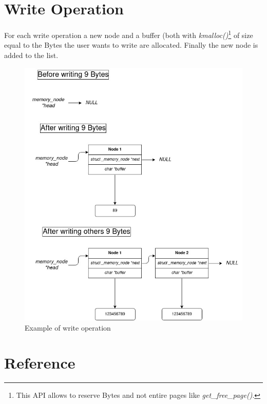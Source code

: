 \documentclass[12pt]{report}
\begin{document}
\chapter{Write Operation}
\label{chap:write operation} 
For each write operation a new node and a buffer (both with \emph{kmalloc()}\footnote{This API allows to reserve Bytes and not entire pages like \emph{get\_free\_page()}.} of size equal to the Bytes the user wants to write are allocated. Finally the new node is added to the list.

\begin{figure}[h]
	\centering
	\includegraphics[scale = .45]{write.jpg}
	\caption{Example of write operation}
	\label{fig:write}
\end{figure}



















\chapter{Reference}
\end{document}
